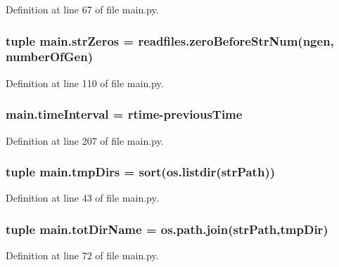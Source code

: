 Definition at line 67 of file main.\+py.

\hypertarget{a00153_a02d59015bebcf0ad1bc1162efca757c3}{
\subsubsection[{str\+Zeros}]{\setlength{\rightskip}{0pt plus 5cm}tuple main.\+str\+Zeros = readfiles.\+zero\+Before\+Str\+Num(ngen, {\bf number\+Of\+Gen})}}\label{a00153_a02d59015bebcf0ad1bc1162efca757c3}


Definition at line 110 of file main.\+py.

\hypertarget{a00153_a5ba0cd0b7538ed8047b2fea322ecb4b7}{
\subsubsection[{time\+Interval}]{\setlength{\rightskip}{0pt plus 5cm}main.\+time\+Interval = {\bf rtime}-\/{\bf previous\+Time}}}\label{a00153_a5ba0cd0b7538ed8047b2fea322ecb4b7}


Definition at line 207 of file main.\+py.

\hypertarget{a00153_a9606754176252315321d1faa6191479e}{
\subsubsection[{tmp\+Dirs}]{\setlength{\rightskip}{0pt plus 5cm}tuple main.\+tmp\+Dirs = sort(os.\+listdir({\bf str\+Path}))}}\label{a00153_a9606754176252315321d1faa6191479e}


Definition at line 43 of file main.\+py.

\hypertarget{a00153_a82f73a786e4c93e909fd689ee0d0812e}{
\subsubsection[{tot\+Dir\+Name}]{\setlength{\rightskip}{0pt plus 5cm}tuple main.\+tot\+Dir\+Name = os.\+path.\+join({\bf str\+Path},tmp\+Dir)}}\label{a00153_a82f73a786e4c93e909fd689ee0d0812e}


Definition at line 72 of file main.\+py.


